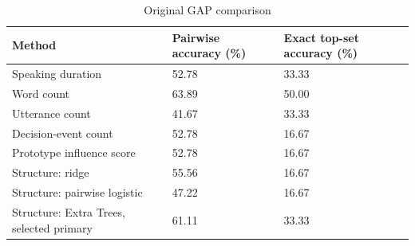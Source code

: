 \documentclass[journal,onecolumn]{IEEEtran}
\begin{document}
\begin{table}[htbp]
\centering\footnotesize
\caption{Original GAP comparison}
\setlength{\tabcolsep}{3pt}
\renewcommand{\arraystretch}{1.15}
\begin{tabular}{p{}p{}p{}}
\toprule
{\raggedright Method\par} & {\raggedright Pairwise accuracy (\%)\par} & {\raggedright Exact top-set accuracy (\%)\par} \\
\midrule
{\raggedright Speaking duration\par} & {\raggedright 52.78\par} & {\raggedright 33.33\par} \\
{\raggedright Word count\par} & {\raggedright 63.89\par} & {\raggedright 50.00\par} \\
{\raggedright Utterance count\par} & {\raggedright 41.67\par} & {\raggedright 33.33\par} \\
{\raggedright Decision-event count\par} & {\raggedright 52.78\par} & {\raggedright 16.67\par} \\
{\raggedright Prototype influence score\par} & {\raggedright 52.78\par} & {\raggedright 16.67\par} \\
{\raggedright Structure: ridge\par} & {\raggedright 55.56\par} & {\raggedright 16.67\par} \\
{\raggedright Structure: pairwise logistic\par} & {\raggedright 47.22\par} & {\raggedright 16.67\par} \\
{\raggedright Structure: Extra Trees, selected primary\par} & {\raggedright 61.11\par} & {\raggedright 33.33\par} \\

\end{tabular}
\end{table}
\end{document}
